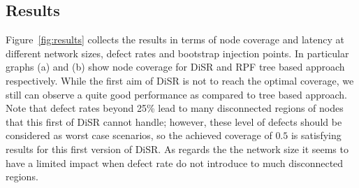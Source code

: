 
\subsection{Results}
\label{sec:results}

Figure~\ref{fig:results} collects the results in terms of node
coverage and latency at different network sizes, defect rates and
bootstrap injection points.  In particular graphs (a) and (b) show
node coverage for DiSR and RPF tree based approach respectively. While
the first aim of DiSR is not to reach the optimal coverage, we still
can observe a quite good performance as compared to tree based
approach. Note that defect rates beyond 25\% lead to many disconnected
regions of nodes that this first of DiSR cannot handle; however, these
level of defects should be considered as worst case scenarios, so the
achieved coverage of $0.5$ is satisfying results for this first
version of DiSR. As regards the the network size it seems to have a
limited impact when defect rate do not introduce to much disconnected
regions. 

